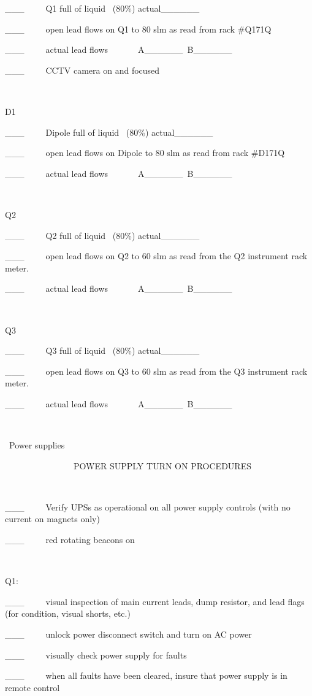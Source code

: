 \_\_\_~~~~~Q1 full of liquid~ (80\%) actual\_\_\_\_\_\_

\_\_\_~~~~~open lead flows on Q1 to 80 slm as read from rack \#Q171Q

\_\_\_~~~~~actual lead flows~~~~~~~A\_\_\_\_\_\_~B\_\_\_\_\_\_

\_\_\_~~~~~CCTV camera on and focused

~

D1

\_\_\_~~~~~Dipole full of liquid~ (80\%) actual\_\_\_\_\_\_

\_\_\_~~~~~open lead flows on Dipole to 80 slm as read from rack \#D171Q

\_\_\_~~~~~actual lead flows~~~~~~~A\_\_\_\_\_\_~B\_\_\_\_\_\_

~

Q2

\_\_\_~~~~~Q2 full of liquid~ (80\%) actual\_\_\_\_\_\_

\_\_\_~~~~~open lead flows on Q2 to 60 slm as read from the Q2 instrument rack
meter.

\_\_\_~~~~~actual lead flows~~~~~~~A\_\_\_\_\_\_~B\_\_\_\_\_\_

~

Q3

\_\_\_~~~~~Q3 full of liquid~ (80\%) actual\_\_\_\_\_\_

\_\_\_~~~~~open lead flows on Q3 to 60 slm as read from the Q3 instrument rack
meter.

\_\_\_~~~~~actual lead flows~~~~~~~A\_\_\_\_\_\_~B\_\_\_\_\_\_

~

~Power supplies

~~~~~~~~~~~~~~~~POWER SUPPLY TURN ON PROCEDURES

~

\_\_\_~~~~~Verify UPSs as operational on all power supply controls (with no
current on magnets only)

\_\_\_~~~~~red rotating beacons on 

~

Q1:~~~~~

\_\_\_~~~~~visual inspection of main current leads, dump resistor, and lead
flags (for condition, visual shorts, etc.)

\_\_\_~~~~~unlock power disconnect switch and turn on AC power

\_\_\_~~~~~visually check power supply for faults

\_\_\_~~~~~when all faults have been cleared, insure that power supply is in
remote control

